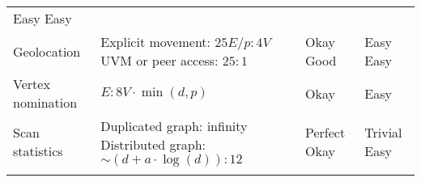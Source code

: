 \documentclass[10pt,oneside]{memoir}
\begin{document}
\begin{longtable}[]{@{}llll@{}}
\begin{minipage}[t]{0.14\columnwidth}
Easy \linebreak Easy\strut
\end{minipage}\tabularnewline
\begin{minipage}[t]{0.25\columnwidth}\raggedright
Geolocation\strut
\end{minipage} & \begin{minipage}[t]{0.37\columnwidth}\raggedright
Explicit movement: \(25E/p : 4V\) \linebreak UVM or peer access:
\(25 : 1\)\strut
\end{minipage} & \begin{minipage}[t]{0.12\columnwidth}\raggedright
Okay \linebreak Good\strut
\end{minipage} & \begin{minipage}[t]{0.14\columnwidth}\raggedright
Easy \linebreak Easy\strut
\end{minipage}\tabularnewline
\begin{minipage}[t]{0.25\columnwidth}\raggedright
Vertex nomination\strut
\end{minipage} & \begin{minipage}[t]{0.37\columnwidth}\raggedright
\(E : 8V \cdot \min(d, p)\)\strut
\end{minipage} & \begin{minipage}[t]{0.12\columnwidth}\raggedright
Okay\strut
\end{minipage} & \begin{minipage}[t]{0.14\columnwidth}\raggedright
Easy\strut
\end{minipage}\tabularnewline
\begin{minipage}[t]{0.25\columnwidth}\raggedright
Scan statistics\strut
\end{minipage} & \begin{minipage}[t]{0.37\columnwidth}\raggedright
Duplicated graph: infinity \linebreak Distributed graph:
\(\sim (d+a \cdot \log(d)):12\)\strut
\end{minipage} & \begin{minipage}[t]{0.12\columnwidth}\raggedright
Perfect \linebreak Okay\strut
\end{minipage} & \begin{minipage}[t]{0.14\columnwidth}\raggedright
Trivial \linebreak Easy\strut
\end{minipage}\tabularnewline
\begin{minipage}[t]{0.25\columnwidth}\raggedright

\end{minipage}
\end{longtable}
\end{document}
